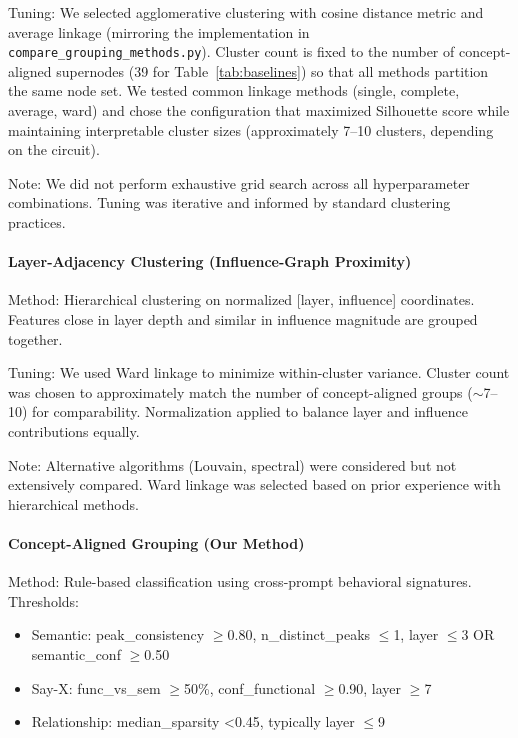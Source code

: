 Tuning: We selected agglomerative clustering with cosine distance metric and average linkage (mirroring the implementation in \texttt{compare\_grouping\_methods.py}). Cluster count is fixed to the number of concept-aligned supernodes (39 for Table~\ref{tab:baselines}) so that all methods partition the same node set. We tested common linkage methods (single, complete, average, ward) and chose the configuration that maximized Silhouette score while maintaining interpretable cluster sizes (approximately 7--10 clusters, depending on the circuit).

Note: We did not perform exhaustive grid search across all hyperparameter combinations. Tuning was iterative and informed by standard clustering practices.

\paragraph{Layer-Adjacency Clustering (Influence-Graph Proximity)}
Method: Hierarchical clustering on normalized [layer, influence] coordinates. Features close in layer depth and similar in influence magnitude are grouped together.

Tuning: We used Ward linkage to minimize within-cluster variance. Cluster count was chosen to approximately match the number of concept-aligned groups ($\sim$7--10) for comparability. Normalization applied to balance layer and influence contributions equally.

Note: Alternative algorithms (Louvain, spectral) were considered but not extensively compared. Ward linkage was selected based on prior experience with hierarchical methods.

\paragraph{Concept-Aligned Grouping (Our Method)}
Method: Rule-based classification using cross-prompt behavioral signatures. Thresholds:
\begin{itemize}
  \item Semantic: peak\_consistency $\ge$0.80, n\_distinct\_peaks $\le$1, layer $\le$3 OR semantic\_conf $\ge$0.50
  \item Say-X: func\_vs\_sem $\ge$50\%, conf\_functional $\ge$0.90, layer $\ge$7
  \item Relationship: median\_sparsity <0.45, typically layer $\le$9
\end{itemize}


